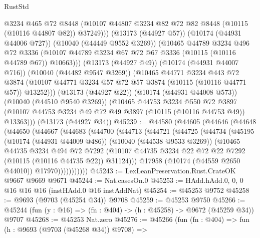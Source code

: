 \begin{lexlean}{RustStd}
\begin{coremodule}
              @3234
              @465
              @72
              @8448
              (@10107 @44807 @3234 @82 @72 @82 @8448 (@10115 (@10116 @44807 @82)) @37249)))
          (@13173 (@44927 @57))
          (@10174 (@44931 @44006 @727))
          (@10040 (@44449 @9552 @3269))
          (@10465
            @44789
            @3234
            @496
            @72
            @3336
            (@10107 @44789 @3234 @67 @72 @67 @3336 (@10115 (@10116 @44789 @67)) @10663)))
        (@13173 (@44927 @49))
        (@10174 (@44931 @44007 @716))
        (@10040 (@44482 @9547 @3269))
        (@10465
          @44771
          @3234
          @443
          @72
          @3874
          (@10107 @44771 @3234 @57 @72 @57 @3874 (@10115 (@10116 @44771 @57)) @13252)))
      (@13173 (@44927 @22))
      (@10174 (@44931 @44008 @573))
      (@10040 (@44510 @9540 @3269))
      (@10465
        @44753
        @3234
        @550
        @72
        @3897
        (@10107 @44753 @3234 @49 @72 @49 @3897 (@10115 (@10116 @44753 @49)) @13363)))
    (@13173 (@44927 @34))
@45239 := @44580
    (@44605
      (@44646
        (@44648
          (@44650
            (@44667
              (@44683
                (@44700
                  (@44713
                    (@44721
                      (@44725
                        (@44734
                          (@45195
                            (@10174 (@44931 @44009 @486))
                            (@10040 (@44538 @9533 @3269))
                            (@10465
                              @44735
                              @3234
                              @494
                              @72
                              @7292
                              (@10107
                                @44735
                                @3234
                                @22
                                @72
                                @22
                                @7292
                                (@10115 (@10116 @44735 @22))
                                @31124)))
                          @17958
                          (@10174 (@44559 @2650 @44010))
                          @17970)))))))))))
@45243 := LexLeanPreservation.Rust.CrateOK @9667 @9669 @9671
@45244 := Nat.casesOn.{0}
@45253 := HAdd.hAdd.{0, 0, 0} @16 @16 @16 (instHAdd.{0} @16 instAddNat)
@45254 := @45253 @9752
@45258 := @9693 (@9703 (@45254 @34)) @9708
@45259 := @45253 @9750
@45266 := @45244 (fun (y : @16) => (fn : @404) -> (h : @45258) -> @9672 (@45259 @34)) @9707
@45268 := @45253 Nat.zero
@45276 := @45266
    (fun (fn : @404) =>
    fun (h : @9693 (@9703 (@45268 @34)) @9708) =>

\end{coremodule}
\end{lexlean}
